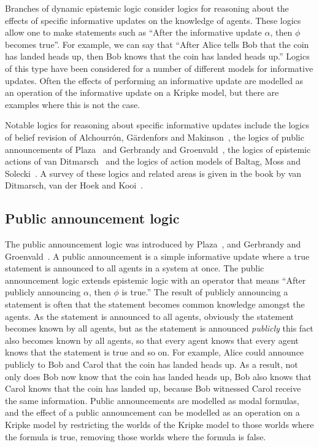 Branches of dynamic epistemic logic consider logics for reasoning about the effects of specific informative updates on the knowledge of agents.
These logics allow one to make statements such as ``After the informative update $\alpha$, then $\phi$ becomes true''.
For example, we can say that ``After Alice tells Bob that the coin has landed heads up, then Bob knows that the coin has landed heads up.''
Logics of this type have been considered for a number of different models for informative updates.
Often the effects of performing an informative update are modelled as an operation of the informative update on a Kripke model, but there are examples where this is not the case.  


Notable logics for reasoning about specific informative updates include the logics of belief revision of Alchourr{\'o}n, G{\"a}rdenfors and Makinson~\cite{alchourron:1985}, the logics of public announcements of Plaza~\cite{plaza:1989} and Gerbrandy and Groenvald~\cite{gerbrandy:1997}, the logics of epistemic actions of van Ditmarsch~\cite{vanditmarsch:1999, vanditmarsch:2000, vanditmarsch:2002} and the logics of action models of Baltag, Moss and Solecki~\cite{baltag:1999, baltag:2004}.
A survey of these logics and related areas is given in the book by van Ditmarsch, van der Hoek and Kooi~\cite{vanditmarsch:2007}.

\subsection{Public announcement logic}

The public announcement logic was introduced by Plaza~\cite{plaza:1989}, and Gerbrandy and Groenvald~\cite{gerbrandy:1997}.
A public announcement is a simple informative update where a true statement is announced to all agents in a system at once.
The public announcement logic extends epistemic logic with an operator that means ``After publicly announcing $\alpha$, then $\phi$ is true.''
The result of publicly announcing a statement is often that the statement becomes common knowledge amongst the agents.
As the statement is announced to all agents, obviously the statement becomes known by all agents, but as the statement is announced {\em publicly} this fact also becomes known by all agents, so that every agent knows that every agent knows that the statement is true and so on.
For example, Alice could announce publicly to Bob and Carol that the coin has landed heads up.
As a result, not only does Bob now know that the coin has landed heads up, Bob also knows that Carol knows that the coin has landed up, because Bob witnessed Carol receive the same information. 
Public announcements are modelled as modal formulas, and the effect of a public announcement can be modelled as an operation on a Kripke model by restricting the worlds of the Kripke model to those worlds where the formula is true, removing those worlds where the formula is false.

